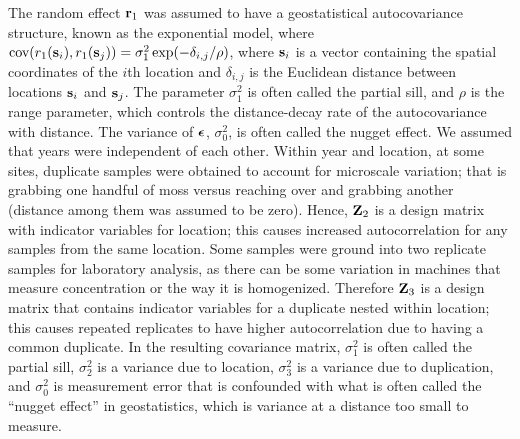 \documentclass[12pt, titlepage]{article}
\begin{document}
The random effect $\mathbf{r}_{1}$ was assumed to have a geostatistical autocovariance structure, known as the exponential model, where $\textrm{cov}(r_{1}(\mathbf{s}_{i}),r_{1}(\mathbf{s}_{j})) = \sigma^{2}_{1}\exp(-\delta_{i,j}/\rho)$, where $\mathbf{s}_{i}$ is a vector containing the spatial coordinates of the $i$th location and $\delta_{i,j}$ is the Euclidean distance between locations $\mathbf{s}_{i}$ and $\mathbf{s}_{j}$. The parameter $\sigma^{2}_{1}$ is often called the partial sill, and $\rho$ is the range parameter, which controls the distance-decay rate of the autocovariance with distance. The variance of $\mbox{\boldmath $\epsilon$}$, $\sigma^{2}_{0}$, is often called the nugget effect.   We assumed that years were independent of each other.  Within year and location, at some sites, duplicate samples were obtained to account for microscale variation; that is grabbing one handful of moss versus reaching over and grabbing another (distance among them was assumed to be zero).  Hence, $\mathbf{Z}_{2}$ is a design matrix with indicator variables for location; this causes increased autocorrelation for any samples from the same location.  Some samples were ground into two replicate samples for laboratory analysis, as there can be some variation in machines that measure concentration or the way it is homogenized.  Therefore $\mathbf{Z}_{3}$ is a design matrix that contains indicator variables for a duplicate nested within location; this causes repeated replicates to have higher autocorrelation due to having a common duplicate.  In the resulting covariance matrix, $\sigma^{2}_{1}$ is often called the partial sill, $\sigma^{2}_{2}$ is a variance due to location, $\sigma^{2}_{3}$ is a variance due to duplication, and $\sigma^{2}_{0}$ is measurement error that is confounded with what is often called the ``nugget effect'' in geostatistics, which is variance at a distance too small to measure.
\end{document}
